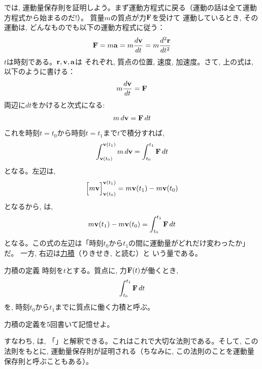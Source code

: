 では, 運動量保存則を証明しよう。まず運動方程式に戻る（運動の話は全て運動方程式から始まるのだ!）。
質量$m$の質点が力${\bf F}$を受けて
運動しているとき, その運動は, どんなものでも以下の運動方程式に従う：
\begin{eqnarray}{\bf F}=m{\bf a}=m\frac{d{\bf v}}{dt}=m\frac{d^2{\bf r}}{dt^2}\end{eqnarray}
$t$は時刻である。${\bf r}, {\bf v}, {\bf a}$は
それぞれ, 質点の位置, 速度, 加速度。さて, 上の式は, 以下のように書ける：
\begin{eqnarray} 
m\frac{d{\bf v}}{dt}={\bf F}\label{eq:maF}
\end{eqnarray} 
両辺に$dt$をかけると次式になる:
\begin{eqnarray} 
m\,d{\bf v}={\bf F}\,dt\label{eq:consmom_mdv_Fdt}
\end{eqnarray} 
これを時刻$t=t_0$から時刻$t=t_1$まで$t$で積分すれば, 
\begin{eqnarray} 
\int_{{\bf v}(t_0)}^{{\bf v}(t_1)}m\,d{\bf v}=\int_{t_0}^{t_1}{\bf F}\,dt\label{eq:momentum_00}
\end{eqnarray} 
となる。左辺は, 
\begin{eqnarray} 
\Bigl[m{\bf v}\Bigr]_{{\bf v}(t_0)}^{{\bf v}(t_1)}=m{\bf v}(t_1)-m{\bf v}(t_0)
\end{eqnarray} 
となるから, は, 
\begin{eqnarray} 
m{\bf v}(t_1)-m{\bf v}(t_0)=\int_{t_0}^{t_1}{\bf F}\,dt\label{eq:momentum1}
\end{eqnarray} 
となる。この式の左辺は「時刻$t_0$から$t_1$の間に運動量がどれだけ変わったか」だ。
一方, 右辺は\underline{力積}（りきせき, と読む）と
いう量である。
\begin{itembox}{力積の定義}
時刻を$t$とする。質点に, 力${\bf F}(t)$が働くとき, 
\begin{eqnarray}
\int_{t_0}^{t_1}{\bf F}\,dt\label{eq:rikiseki}
\end{eqnarray}
を, 時刻$t_0$から$t_1$までに質点に働く力積と呼ぶ。
\end{itembox}

\begin{q}\label{q:def_rikiseki}
力積の定義を5回書いて記憶せよ。\end{q}\mv

すなわち, は, 「」と解釈できる。これはこれで大切な法則である。そして, この法則をもとに, 運動量保存則が証明される（ちなみに, この法則のことを運動量保存則と呼ぶこともある）。

